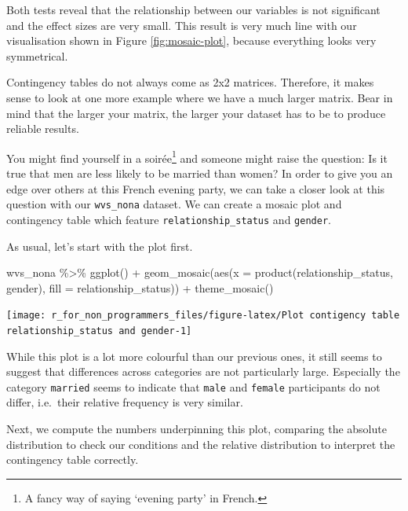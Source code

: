 \documentclass[
]{book}
\newenvironment{Shaded}{\begin{snugshade}}{\end{snugshade}}
\newcommand{\AttributeTok}[1]{\textcolor[rgb]{0.77,0.63,0.00}{#1}}
\newcommand{\FunctionTok}[1]{\textcolor[rgb]{0.00,0.00,0.00}{#1}}
\newcommand{\NormalTok}[1]{#1}
\newcommand{\SpecialCharTok}[1]{\textcolor[rgb]{0.00,0.00,0.00}{#1}}
\begin{document}
Both tests reveal that the relationship between our variables is not significant and the effect sizes are very small. This result is very much line with our visualisation shown in Figure \ref{fig:mosaic-plot}, because everything looks very symmetrical.

Contingency tables do not always come as 2x2 matrices. Therefore, it makes sense to look at one more example where we have a much larger matrix. Bear in mind that the larger your matrix, the larger your dataset has to be to produce reliable results.

You might find yourself in a soirée\footnote{A fancy way of saying `evening party' in French.} and someone might raise the question: Is it true that men are less likely to be married than women? In order to give you an edge over others at this French evening party, we can take a closer look at this question with our \texttt{wvs\_nona} dataset. We can create a mosaic plot and contingency table which feature \texttt{relationship\_status} and \texttt{gender}.

As usual, let's start with the plot first.

\begin{Shaded}
\begin{Highlighting}[]
\NormalTok{wvs\_nona }\SpecialCharTok{\%\textgreater{}\%}
  \FunctionTok{ggplot}\NormalTok{() }\SpecialCharTok{+}
  \FunctionTok{geom\_mosaic}\NormalTok{(}\FunctionTok{aes}\NormalTok{(}\AttributeTok{x =} \FunctionTok{product}\NormalTok{(relationship\_status, gender),}
                  \AttributeTok{fill =}\NormalTok{ relationship\_status)) }\SpecialCharTok{+} 
  \FunctionTok{theme\_mosaic}\NormalTok{()}
\end{Highlighting}
\end{Shaded}

\begin{center}\texttt{[image: r\_for\_non\_programmers\_files/figure-latex/Plot contigency table relationship\_status and gender-1]} \end{center}

While this plot is a lot more colourful than our previous ones, it still seems to suggest that differences across categories are not particularly large. Especially the category \texttt{married} seems to indicate that \texttt{male} and \texttt{female} participants do not differ, i.e.~their relative frequency is very similar.

Next, we compute the numbers underpinning this plot, comparing the absolute distribution to check our conditions and the relative distribution to interpret the contingency table correctly.
\end{document}
